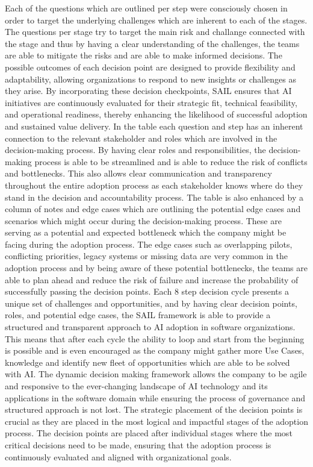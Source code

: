 \documentclass[]{imc-inf}
\begin{document}
Each of the questions which are outlined per step were consciously
chosen in order to target the underlying challenges which are inherent
to each of the stages. The questions per stage try to target the main
risk and challange connected with the stage and thus by having a clear
understanding of the challenges, the teams are able to mitigate the
risks and are able to make informed decisions. The possible outcomes of
each decision point are designed to provide flexibility and
adaptability, allowing organizations to respond to new insights or
challenges as they arise. By incorporating these decision checkpoints,
SAIL ensures that AI initiatives are continuously evaluated for their
strategic fit, technical feasibility, and operational readiness, thereby
enhancing the likelihood of successful adoption and sustained value
delivery. In the table each question and step has an inherent connection
to the relevant stakeholder and roles which are involved in the
decision-making process. By having clear roles and responsibilities, the
decision-making process is able to be streamlined and is able to reduce
the risk of conflicts and bottlenecks. This also allows clear
communication and transparency throughout the entire adoption process as
each stakeholder knows where do they stand in the decision and
accountability process. The table is also enhanced by a column of notes
and edge cases which are outlining the potential edge cases and
scenarios which might occur during the decision-making process. These
are serving as a potential and expected bottleneck which the company
might be facing during the adoption process. The edge cases such as
overlapping pilots, conflicting priorities, legacy systems or missing
data are very common in the adoption process and by being aware of these
potential bottlenecks, the teams are able to plan ahead and reduce the
risk of failure and increase the probability of successfully passing the
decision points. Each 8 step decision cycle presents a unique set of
challenges and opportunities, and by having clear decision points,
roles, and potential edge cases, the SAIL framework is able to provide a
structured and transparent approach to AI adoption in software
organizations. This means that after each cycle the ability to loop and
start from the beginning is possible and is even encouraged as the
company might gather more Use Cases, knowledge and identify new fleet of
opportunities which are able to be solved with AI. The dynamic decision
making framework allows the company to be agile and responsive to the
ever-changing landscape of AI technology and its applications in the
software domain while ensuring the process of governance and structured
approach is not lost. The strategic placement of the decision points is
crucial as they are placed in the most logical and impactful stages of
the adoption process. The decision points are placed after individual
stages where the most critical decisions need to be made, ensuring that
the adoption process is continuously evaluated and aligned with
organizational goals.
\end{document}
